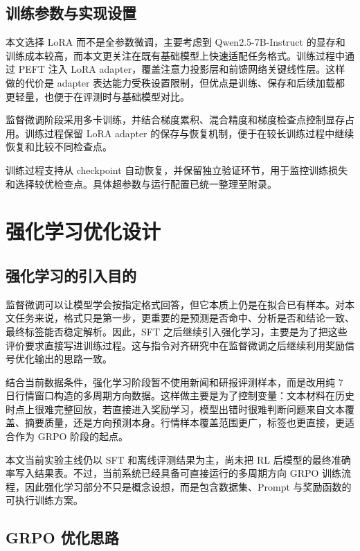 \subsection{训练参数与实现设置}

本文选择 LoRA 而不是全参数微调，主要考虑到 Qwen2.5-7B-Instruct 的显存和训练成本较高，而本文更关注在既有基础模型上快速适配任务格式\cite{hu2021lora}。训练过程中通过 PEFT 注入 LoRA adapter，覆盖注意力投影层和前馈网络关键线性层。这样做的代价是 adapter 表达能力受秩设置限制，但优点是训练、保存和后续加载都更轻量，也便于在评测时与基础模型对比。

监督微调阶段采用多卡训练，并结合梯度累积、混合精度和梯度检查点控制显存占用。训练过程保留 LoRA adapter 的保存与恢复机制，便于在较长训练过程中继续恢复和比较不同检查点。

训练过程支持从 checkpoint 自动恢复，并保留独立验证环节，用于监控训练损失和选择较优检查点。具体超参数与运行配置已统一整理至附录。

\section{强化学习优化设计}

\subsection{强化学习的引入目的}

监督微调可以让模型学会按指定格式回答，但它本质上仍是在拟合已有样本。对本文任务来说，格式只是第一步，更重要的是预测是否命中、分析是否和结论一致、最终标签能否稳定解析。因此，SFT 之后继续引入强化学习，主要是为了把这些评价要求直接写进训练过程。这与指令对齐研究中在监督微调之后继续利用奖励信号优化输出的思路一致\cite{ouyang2022instructgpt}。

结合当前数据条件，强化学习阶段暂不使用新闻和研报评测样本，而是改用纯 7 日行情窗口构造的多周期方向数据。这样做主要是为了控制变量：文本材料在历史时点上很难完整回放，若直接进入奖励学习，模型出错时很难判断问题来自文本覆盖、摘要质量，还是方向预测本身。行情样本覆盖范围更广，标签也更直接，更适合作为 GRPO 阶段的起点。

本文当前实验主线仍以 SFT 和离线评测结果为主，尚未把 RL 后模型的最终准确率写入结果表。不过，当前系统已经具备可直接运行的多周期方向 GRPO 训练流程，因此强化学习部分不只是概念设想，而是包含数据集、Prompt 与奖励函数的可执行训练方案。

\subsection{GRPO 优化思路}

